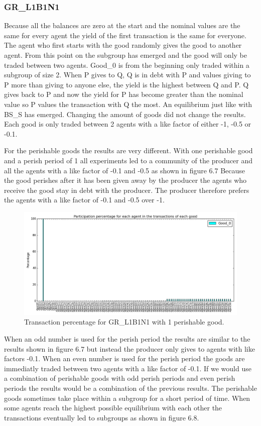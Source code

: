 \documentclass[twoside,openright]{uva-bachelor-thesis}
\begin{document}
\subsubsection{GR\_L1B1N1}
Because all the balances are zero at the start and the nominal values are the same for every agent the yield of the first transaction is the same for everyone. The agent who first starts with the good randomly gives the good to another agent. From this point on the subgroup has emerged and the good will only be traded between two agents. Good\_0 is from the beginning only traded within a subgroup of size 2.  When P gives to Q, Q is in debt with P and values giving to P more than giving to anyone else, the yield is the highest between Q and P. Q gives back to P and now the yield for P has become greater than the nominal value so P values the transaction with Q the most. An equilibrium just like with BS\_S has emerged. Changing the amount of goods did not change the results. Each good is only traded between 2 agents with a like factor of either -1, -0.5 or -0.1.

For the perishable goods the results are very different. With one perishable good and a perish period of 1 all experiments led to a community of the producer and all the agents with a like factor of -0.1 and -0.5 as shown in figure 6.7 Because the good perishes after it has been given away by the producer the agents who receive the good stay in debt with the producer. The producer therefore prefers the agents with a like factor of -0.1 and -0.5 over -1. \\
\begin{figure}[h!]
  \centering
   \includegraphics[scale=0.4]{Simulation_figures/GR_L1B1N1/1perishable_1-1_15k}
  \caption{Transaction percentage for GR\_L1B1N1 with 1 perishable good.}
\end{figure}

When an odd number is used for the perish period the results are similar to the results shown in figure 6.7 but instead the producer only gives to agents with like factors -0.1. When an even number is used for the perish period the goods are immediatly traded between two agents with a like factor of -0.1. If we would use a combination of perishable goods with odd perish periods and even perish periods the results would be a combination of the previous results. The perishable goods sometimes take place within a subgroup for a short period of time. When some agents reach the highest possible equilibrium with each other the transactions eventually led to subgroups as shown in figure 6.8.
\end{document}
